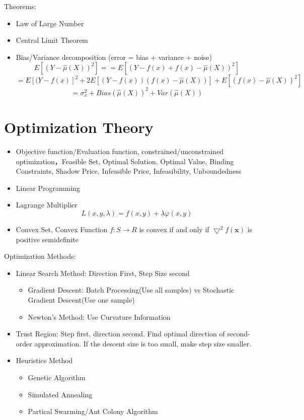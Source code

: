 \documentclass[11pt, openany]{book}              %
\begin{document}
Theorems:

\begin{itemize}
    \item Law of Large Number
    \item Central Limit Theorem
        \item Bias/Variance decomposition (error = bias + variance + noise)
        $$E[(Y-\hat{\mu}(X))^2]  = = E[(Y-f(x) + f(x) -\hat{\mu}(X))^2]$$
    $$= E[(Y-f(x)]^2 + 2E[(Y-f(x))(f(x) - \hat{\mu}(X))] + E[(f(x)-\hat{\mu}(X))^2]$$
    $$ =\sigma_x^2 + Bias(\hat{\mu}(X))^2 + Var(\hat{\mu}(X))$$
 
\end{itemize}
 
 
\section{Optimization Theory}

\begin{itemize}
    \item Objective function/Evaluation function, constrained/unconstrained optimization，Feasible Set, Optimal Solution, Optimal Value, Binding Constraints, Shadow Price, Infeasible Price, Infeasibility, Unboundedness    
    \item Linear Programming
    \item Lagrange Multiplier $$L(x,y,\lambda) = f(x,y) + \lambda \varphi(x,y) $$
    \item Convex Set, Convex Function $f:S\to R$ is convex if and only if $\bigtriangledown^2 f(\mathbf{x})$ is positive semidefinite 
\end{itemize}

Optimization Methods:
\begin{itemize}
    \item Linear Search Method: Direction First, Step Size second	
    	\begin{itemize}  		
    		\item Gradient Descent: Batch Processing(Use all samples) vs Stochastic Gradient Descent(Use one sample)
    		\item Newton's Method: Use Curvature Information 
   		\end{itemize}
   	\item Trust Region: Step first, direction second. Find optimal direction of second-order approximation. If the descent size is too small, make step size smaller.
   	\item Heuristics Method
   		\begin{itemize}  		
	    	\item Genetic Algorithm
	 	   	\item Simulated Annealing 
	    	\item Partical Swarming/Ant Colony Algorithm
	    \end{itemize}
\end{itemize}
\end{document}
